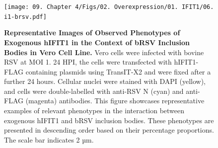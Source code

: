 \begin{figure}
    \centering
    \texttt{[image: 09. Chapter 4/Figs/02. Overexpression/01. IFIT1/06. i1-brsv.pdf]}
    \caption[Representative Images of Observed Phenotypes of Exogenous hIFIT1 in the Context of bRSV Inclusion Bodies in Vero Cell Line.]{\textbf{Representative Images of Observed Phenotypes of Exogenous hIFIT1 in the Context of bRSV Inclusion Bodies in Vero Cell Line.} Vero cells were infected with bovine RSV at MOI 1. 24 HPI, the cells were transfected with hIFIT1-FLAG containing plasmids using TransIT-X2 and were fixed after a further 24 hours. Cellular nuclei were stained with DAPI (yellow), and cells were double-labelled with anti-RSV N (cyan) and anti-FLAG (magenta) antibodies. This figure showcases representative examples of relevant phenotypes in the interaction between exogenous hIFIT1 and bRSV inclusion bodies. These phenotypes are presented in descending order based on their percentage proportions. The scale bar indicates 2 µm.}
    \label{fig:Representative Images of Observed Phenotypes of Exogenous hIFIT1 in the Context of bRSV Inclusion Bodies in VERO Cell Line}
\end{figure}

